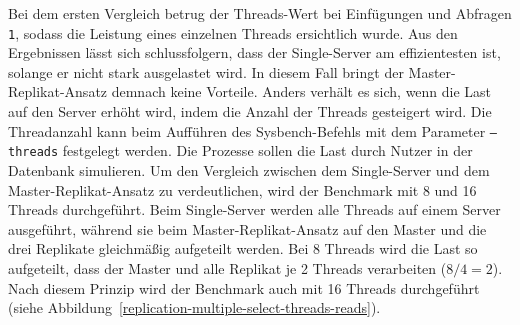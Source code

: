 Bei dem ersten Vergleich betrug der Threads-Wert bei Einfügungen und Abfragen \texttt{1}, sodass die Leistung eines einzelnen Threads ersichtlich wurde.
Aus den Ergebnissen lässt sich schlussfolgern, dass der Single-Server am effizientesten ist, solange er nicht stark ausgelastet wird.
In diesem Fall bringt der Master-Replikat-Ansatz demnach keine Vorteile.
Anders verhält es sich, wenn die Last auf den Server erhöht wird, indem die Anzahl der Threads gesteigert wird.
Die Threadanzahl kann beim Aufführen des Sysbench-Befehls mit dem Parameter \texttt{--threads} festgelegt werden.
Die Prozesse sollen die Last durch Nutzer in der Datenbank simulieren.
Um den Vergleich zwischen dem Single-Server und dem Master-Replikat-Ansatz zu verdeutlichen, wird der Benchmark mit 8 und 16 Threads durchgeführt.
Beim Single-Server werden alle Threads auf einem Server ausgeführt, während sie beim Master-Replikat-Ansatz auf den Master und die drei Replikate gleichmäßig aufgeteilt werden.
Bei 8 Threads wird die Last so aufgeteilt, dass der Master und alle Replikat je 2 Threads verarbeiten ($8 / 4 = 2$).
Nach diesem Prinzip wird der Benchmark auch mit 16 Threads durchgeführt (siehe Abbildung~\ref{replication-multiple-select-threads-reads}).

